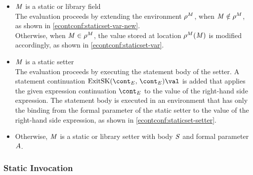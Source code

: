 \documentclass[a4paper,oneside]{article}
\begin{document}
\begin{itemize}
    \item $\mathit{M}$ is a static or library field\\
        The evaluation proceeds by extending the environment $\rho^{M}$, when $\mathit{M} \notin \rho^{M}$, as shown in \eqref{econtconf:staticset-var-new}.\\
        Otherwise, when $\mathit{M} \in \rho^{M}$, the value stored at location $\rho^{M}(\mathit{M})$ is modified accordingly, as shown in \eqref{econtconf:staticset-var}.

    \item $\mathit{M}$ is a static setter\\
        The evaluation proceeds by executing the statement body of the setter. A statement continuation $\ExitSK{\econt}{\val}$ is added that applies the given expression continuation $\econt$ to the value of the right-hand side expression.
        The statement body is executed in an environment that has only the binding from the formal parameter of the static setter to the value of the right-hand side expression, as shown in \eqref{econtconf:staticset-setter}.

    \item Otherwise, $\mathit{M}$ is a static or library setter with body $\mathit{S}$ and formal parameter $A$.

\end{itemize}


\subsubsection{Static Invocation}
\end{document}
